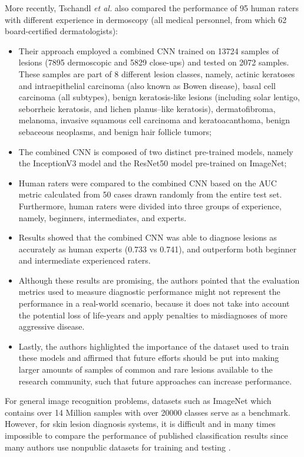     More recently, Tschandl \textit{et al.} \cite{Tschandl2019} also compared the performance of 95 human raters with different experience in dermoscopy (all medical personnel, from which 62 board-certified dermatologists):
    \begin{itemize}
        \item Their approach employed a combined \ac{CNN} trained on 13724 samples of lesions (7895 dermoscopic and 5829 close-ups) and tested on 2072 samples. These samples are part of 8 different lesion classes, namely, actinic keratoses and intraepithelial carcinoma (also known as Bowen disease), basal cell carcinoma (all subtypes), benign keratosis-like lesions (including solar lentigo, seborrheic keratosis, and lichen planus–like keratosis), dermatofibroma, melanoma, invasive squamous cell carcinoma and keratoacanthoma, benign sebaceous neoplasms, and benign hair follicle tumors;
        \item The combined \ac{CNN} is composed of two distinct pre-trained models, namely the InceptionV3 \cite{inceptionv3} model and the ResNet50 model \cite{resnet} pre-trained on ImageNet;
        \item Human raters were compared to the combined \ac{CNN} based on the \ac{AUC} metric calculated from 50 cases drawn randomly from the entire test set. Furthermore, human raters were divided into three groups of experience, namely, beginners, intermediates, and experts.
        \item Results showed that the combined \ac{CNN} was able to diagnose lesions as accurately as human experts (0.733 vs 0.741), and outperform both beginner and intermediate experienced raters. 
        \item Although these results are promising, the authors pointed that the evaluation metrics used to measure diagnostic performance might not represent the performance in a real-world scenario, because it does not take into account the potential loss of life-years and apply penalties to misdiagnoses of more aggressive disease. 
        \item Lastly, the authors highlighted the importance of the dataset used to train these models and affirmed that future efforts should be put into making larger amounts of samples of common and rare lesions available to the research community, such that future approaches can increase performance.
    \end{itemize}
    
    For general image recognition problems, datasets such as ImageNet \cite{Deng2010} which contains over 14 Million samples with over 20000 classes serve as a benchmark. However, for skin lesion diagnosis systems, it is difficult and in many times impossible to compare the performance of published classification results since many authors use nonpublic datasets for training and testing \cite{Brinker2018}. \par
    
